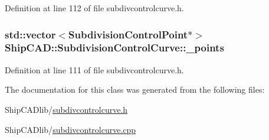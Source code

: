 Definition at line 112 of file subdivcontrolcurve.\-h.

\hypertarget{classShipCAD_1_1SubdivisionControlCurve_ac54ea0783b3f8f2aa65d49fe489f1b4f}{
\subsubsection[{\-\_\-points}]{\setlength{\rightskip}{0pt plus 5cm}std\-::vector$<${\bf Subdivision\-Control\-Point}$\ast$$>$ Ship\-C\-A\-D\-::\-Subdivision\-Control\-Curve\-::\-\_\-points\hspace{0.3cm}{\ttfamily [protected]}}}\label{classShipCAD_1_1SubdivisionControlCurve_ac54ea0783b3f8f2aa65d49fe489f1b4f}


Definition at line 111 of file subdivcontrolcurve.\-h.



The documentation for this class was generated from the following files\-:\begin{DoxyCompactItemize}
\item 
Ship\-C\-A\-Dlib/\hyperlink{subdivcontrolcurve_8h}{subdivcontrolcurve.\-h}\item 
Ship\-C\-A\-Dlib/\hyperlink{subdivcontrolcurve_8cpp}{subdivcontrolcurve.\-cpp}\end{DoxyCompactItemize}
